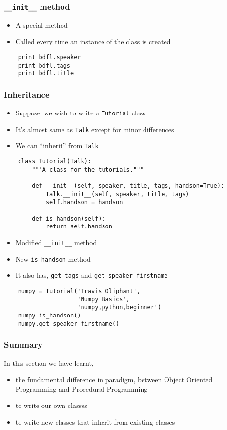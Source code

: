 \begin{frame}[fragile]
  \frametitle{\texttt{\_\_init\_\_} method}
  \begin{itemize}
  \item A special method 
  \item Called every time an instance of the class is created
  \end{itemize}
  \begin{lstlisting}
    print bdfl.speaker
    print bdfl.tags
    print bdfl.title
  \end{lstlisting}
\end{frame}

\begin{frame}
  \frametitle{Inheritance}
  \begin{itemize}
  \item Suppose, we wish to write a \texttt{Tutorial} class
  \item It's almost same as \texttt{Talk} except for minor differences
  \item We can ``inherit'' from \texttt{Talk}
  \end{itemize}
  \begin{lstlisting}
    class Tutorial(Talk):
        """A class for the tutorials."""

        def __init__(self, speaker, title, tags, handson=True):
            Talk.__init__(self, speaker, title, tags)
            self.handson = handson

        def is_handson(self):
            return self.handson
  \end{lstlisting}
  \begin{itemize}
  \item Modified \texttt{\_\_init\_\_} method
  \item New \texttt{is\_handson} method
  \item It also has, \texttt{get\_tags} and
    \texttt{get\_speaker\_firstname} 
  \end{itemize}
  \begin{lstlisting}
    numpy = Tutorial('Travis Oliphant', 
                     'Numpy Basics', 
                     'numpy,python,beginner')
    numpy.is_handson()
    numpy.get_speaker_firstname()
  \end{lstlisting}
\end{frame}

\begin{frame}[fragile]
  \frametitle{Summary}
  In this section we have learnt,
  \begin{itemize}
  \item the fundamental difference in paradigm, between Object Oriented
    Programming and Procedural Programming
  \item to write our own classes
  \item to write new classes that inherit from existing classes
  \end{itemize}
\end{frame}

